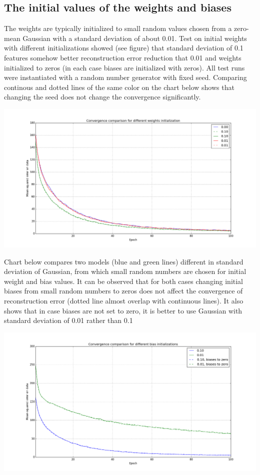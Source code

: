 \documentclass[a4paper]{scrartcl}
\begin{document}
\subsection{The initial values of the weights and biases}
The weights are typically initialized to small random values chosen from a zero-mean Gaussian with a standard deviation of about 0.01. Test on initial weights with different initializations showed (see figure) that standard deviation of 0.1 features somehow better reconstruction error reduction that 0.01 and weights initialized to zeros (in each case biases are initialized with zeros).
All test runs were instantiated with a random number generator with fixed seed. Comparing continous and dotted lines of the same color on the chart below shows that changing the seed does not change the convergence significantly.
\begin{center}
\includegraphics[width=14cm]{images/weights_seeds.png}
\end{center}
Chart below compares two models (blue and green lines) different in standard deviation of Gaussian, from which small random numbers are chosen for initial weight and bias values. It can be observed that for both cases changing initial biases from small random numbers to zeros does not affect the convergence of reconstruction error (dotted line almost overlap with continuous lines). It also shows that in case biases are not set to zero, it is better to use Gaussian with standard deviation of 0.01 rather than 0.1
\begin{center}
\includegraphics[width=14cm]{images/bias.png}
\end{center}
\end{document}
